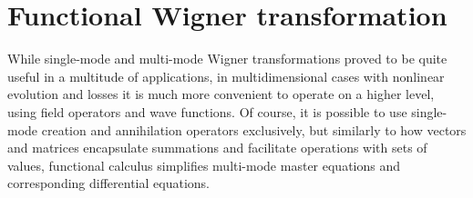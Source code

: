 \chapter{Functional Wigner transformation}
\label{cha:wigner}

While single-mode and multi-mode Wigner transformations proved to be quite useful in a multitude of applications, in multidimensional cases with nonlinear evolution and losses it is much more convenient to operate on a higher level, using field operators and wave functions.
Of course, it is possible to use single-mode creation and annihilation operators exclusively,
but similarly to how vectors and matrices encapsulate summations and facilitate operations with sets of values, functional calculus simplifies multi-mode master equations and corresponding differential equations.




